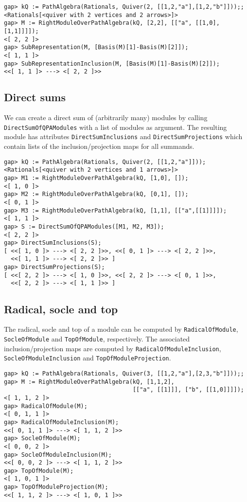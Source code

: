 \documentclass{amsart}
\theoremstyle{definition}
\theoremstyle{theoretic}
\begin{document}
\begin{verbatim}
gap> kQ := PathAlgebra(Rationals, Quiver(2, [[1,2,"a"],[1,2,"b"]]));;
<Rationals[<quiver with 2 vertices and 2 arrows>]>
gap> M := RightModuleOverPathAlgebra(kQ, [2,2], [["a", [[1,0],[1,1]]]]);
<[ 2, 2 ]>
gap> SubRepresentation(M, [Basis(M)[1]-Basis(M)[2]]);
<[ 1, 1 ]>
gap> SubRepresentationInclusion(M, [Basis(M)[1]-Basis(M)[2]]);
<<[ 1, 1 ]> ---> <[ 2, 2 ]>>
\end{verbatim}

\subsection{Direct sums}

We can create a direct sum of (arbitrarily many) modules by calling
\texttt{DirectSumOfQPAModules} with a list of modules as argument.
The resulting module has attributes \texttt{DirectSumInclusions} and
\texttt{DirectSumProjections} which contain lists of the
inclusion/projection maps for all summands.

\begin{verbatim}
gap> kQ := PathAlgebra(Rationals, Quiver(2, [[1,2,"a"]]));
<Rationals[<quiver with 2 vertices and 1 arrows>]>
gap> M1 := RightModuleOverPathAlgebra(kQ, [1,0], []);
<[ 1, 0 ]>
gap> M2 := RightModuleOverPathAlgebra(kQ, [0,1], []);
<[ 0, 1 ]>
gap> M3 := RightModuleOverPathAlgebra(kQ, [1,1], [["a",[[1]]]]);
<[ 1, 1 ]>
gap> S := DirectSumOfQPAModules([M1, M2, M3]);
<[ 2, 2 ]>
gap> DirectSumInclusions(S);
[ <<[ 1, 0 ]> ---> <[ 2, 2 ]>>, <<[ 0, 1 ]> ---> <[ 2, 2 ]>>,
  <<[ 1, 1 ]> ---> <[ 2, 2 ]>> ]
gap> DirectSumProjections(S);
[ <<[ 2, 2 ]> ---> <[ 1, 0 ]>>, <<[ 2, 2 ]> ---> <[ 0, 1 ]>>,
  <<[ 2, 2 ]> ---> <[ 1, 1 ]>> ]
\end{verbatim}

\subsection{Radical, socle and top}

The radical, socle and top of a module can be computed by
\texttt{RadicalOfModule}, \texttt{SocleOfModule} and
\texttt{TopOfModule}, respectively.  The associated
inclusion/projection maps are computed by
\texttt{RadicalOfModuleInclusion}, \texttt{SocleOfModuleInclusion} and
\texttt{TopOfModuleProjection}.

\begin{verbatim}
gap> kQ := PathAlgebra(Rationals, Quiver(3, [[1,2,"a"],[2,3,"b"]]));;
gap> M := RightModuleOverPathAlgebra(kQ, [1,1,2],
                                     [["a", [[1]]], ["b", [[1,0]]]]);
<[ 1, 1, 2 ]>
gap> RadicalOfModule(M);
<[ 0, 1, 1 ]>
gap> RadicalOfModuleInclusion(M);
<<[ 0, 1, 1 ]> ---> <[ 1, 1, 2 ]>>
gap> SocleOfModule(M);
<[ 0, 0, 2 ]>
gap> SocleOfModuleInclusion(M);
<<[ 0, 0, 2 ]> ---> <[ 1, 1, 2 ]>>
gap> TopOfModule(M);
<[ 1, 0, 1 ]>
gap> TopOfModuleProjection(M);
<<[ 1, 1, 2 ]> ---> <[ 1, 0, 1 ]>>
\end{verbatim}
\end{document}

